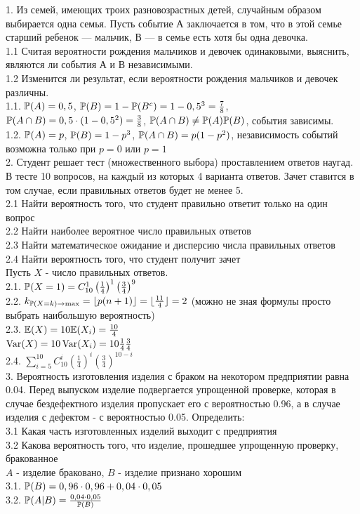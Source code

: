 \documentclass[12pt, a4paper]{article}\usepackage[]{graphicx}\usepackage[]{color}
\begin{document}
1.  Из семей, имеющих троих разновозрастных детей, случайным
образом выбирается одна семья. Пусть событие А заключается в том,
что в этой семье
старший ребенок — мальчик, В — в семье есть хотя бы одна девочка. \\
1.1 Считая вероятности рождения мальчиков и девочек одинаковыми,
выяснить, являются ли события А и В независимыми. \\
1.2 Изменится ли результат, если вероятности рождения мальчиков и
девочек различны. \\
1.1. $\P(A)=0,5$, $\P(B)=1-\P(B^{c})=1-0,5^{3}=\frac{7}{8}$, $\P(A\cap
B)=0,5\cdot (1-0,5^{2})=\frac{3}{8}$, $\P(A\cap B)\neq \P(A)\P(B)$,
события зависимы. \\
1.2. $\P(A)=p$, $\P(B)=1-p^{3}$, $\P(A\cap B)=p(1-p^{2})$,
независимость событий возможна только при $p=0$ или $p=1$ \\

2.  Студент решает тест (множественного выбора) проставлением
ответов наугад. В тесте 10 вопросов, на каждый из которых 4
варианта ответов. Зачет ставится в том случае, если правильных
ответов будет не менее 5. \\
2.1 Найти вероятность того, что студент правильно ответит только
на один вопрос \\
2.2 Найти наиболее вероятное число правильных ответов \\
2.3 Найти математическое ожидание и дисперсию числа правильных
ответов \\
2.4 Найти вероятность того, что студент получит зачет \\
Пусть $X$ - число правильных ответов. \\
2.1. $\P(X=1)=C_{10}^{1}\left(\frac{1}{4}\right)^{1}\left(\frac{3}{4}\right)^{9}$ \\
2.2. $k_{\P(X=k)\rightarrow \max}=\lfloor p(n+1)\rfloor=\lfloor
\frac{11}{4}\rfloor=2$ (можно не зная формулы просто выбрать
наибольшую вероятность) \\
2.3. $\E(X)=10\E(X_{i})=\frac{10}{4}$ \\
$\Var(X)=10\Var(X_{i})=10\frac{1}{4}\frac{3}{4}$ \\
2.4.
$\sum_{i=5}^{10}C_{10}^{i}\left(\frac{1}{4}\right)^{i}\left(\frac{3}{4}\right)^{10-i}$
\\

3.  Вероятность изготовления изделия с браком на некотором
предприятии равна 0.04. Перед выпуском изделие подвергается
упрощенной проверке, которая в случае бездефектного изделия
пропускает его с вероятностью 0.96, а в случае изделия с дефектом
- с вероятностью 0.05. Определить: \\
3.1 Какая часть изготовленных изделий выходит с предприятия \\
3.2 Какова вероятность того, что изделие, прошедшее упрощенную
проверку, бракованное \\
$A$ - изделие браковано, $B$ - изделие признано хорошим \\
3.1. $\P(B)=0,96\cdot 0,96+0,04\cdot 0,05$ \\
3.2. $\P(A|B)=\frac{0,04\cdot 0,05}{\P(B)}$ \\
\end{document}
